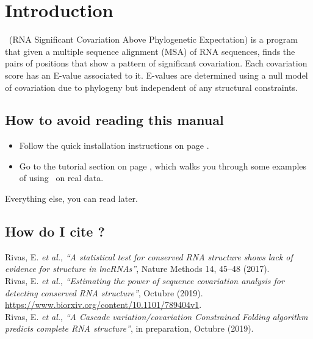 \section{Introduction}
\setcounter{footnote}{0}

\rscape\ (RNA Significant Covariation Above Phylogenetic Expectation)
is a program that given a multiple sequence alignment (MSA) of RNA
sequences, finds the pairs of positions that show a pattern of
significant covariation. Each covariation score has an E-value
associated to it. E-values are determined using a null model of
covariation due to phylogeny but independent of any structural
constraints. 

\subsection{How to avoid reading this manual}

\begin{itemize}
\item Follow the quick installation instructions on page
      \pageref{section:installation}. 
\item Go to the tutorial section on page
\pageref{section:tutorial}, which walks you through some examples of
using \rscape\ on real data.
\end{itemize}

Everything else, you can read later.



\subsection{How do I cite \rscape?}

Rivas, E. \textit{et al.}, \textit{``A statistical test for conserved
  RNA structure shows lack of evidence for structure in lncRNAs''},
Nature Methods 14, 45–48 (2017).\\

\noindent
Rivas, E. \textit{et al.}, \textit{``Estimating the power of sequence
  covariation analysis for detecting conserved RNA structure''},
Octubre (2019).
\url{https://www.biorxiv.org/content/10.1101/789404v1}.\\

\noindent
Rivas, E. \textit{et al.}, \textit{``A Cascade variation/covariation
  Constrained Folding algorithm predicts complete RNA structure''}, in preparation,
Octubre (2019).  













  









